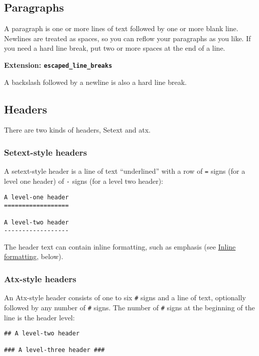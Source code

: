 \documentclass[]{article}
\begin{document}
\subsection{Paragraphs}

A paragraph is one or more lines of text followed by one or more blank
line. Newlines are treated as spaces, so you can reflow your paragraphs
as you like. If you need a hard line break, put two or more spaces at
the end of a line.

\textbf{Extension: \texttt{escaped\_line\_breaks}}

A backslash followed by a newline is also a hard line break.

\subsection{Headers}

There are two kinds of headers, Setext and atx.

\subsubsection{Setext-style headers}

A setext-style header is a line of text ``underlined'' with a row of
\texttt{=} signs (for a level one header) of \texttt{-} signs (for a
level two header):

\begin{verbatim}
A level-one header
==================

A level-two header
------------------
\end{verbatim}

The header text can contain inline formatting, such as emphasis (see
\hyperref[inline-formatting]{Inline formatting}, below).

\subsubsection{Atx-style headers}

An Atx-style header consists of one to six \texttt{\#} signs and a line
of text, optionally followed by any number of \texttt{\#} signs. The
number of \texttt{\#} signs at the beginning of the line is the header
level:

\begin{verbatim}
## A level-two header

### A level-three header ###
\end{verbatim}
\end{document}
